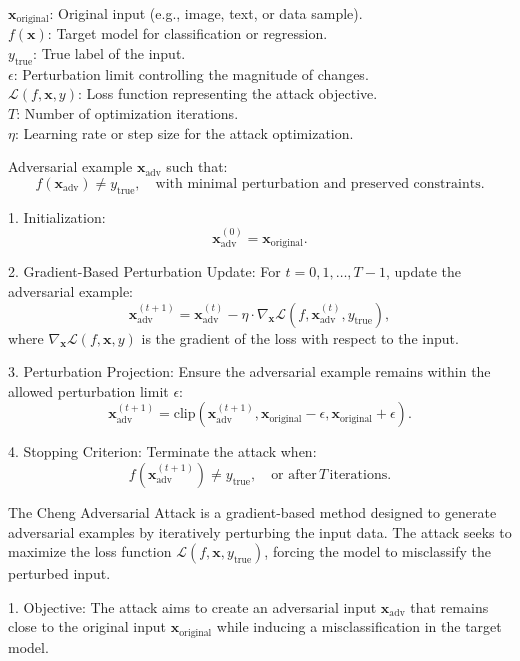 $\mathbf{x}_{\text{original}}$: Original input (e.g., image, text, or data sample). \\
$f(\mathbf{x})$: Target model for classification or regression. \\
$y_{\text{true}}$: True label of the input. \\
$\epsilon$: Perturbation limit controlling the magnitude of changes. \\
$\mathcal{L}(f, \mathbf{x}, y)$: Loss function representing the attack objective. \\
$T$: Number of optimization iterations. \\
$\eta$: Learning rate or step size for the attack optimization.

Adversarial example $\mathbf{x}_{\text{adv}}$ such that:
\[
f(\mathbf{x}_{\text{adv}}) \neq y_{\text{true}}, \quad \text{with minimal perturbation and preserved constraints}.
\]

1. Initialization:
   \[
   \mathbf{x}_{\text{adv}}^{(0)} = \mathbf{x}_{\text{original}}.
   \]

2. Gradient-Based Perturbation Update:
   For $t = 0, 1, \ldots, T-1$, update the adversarial example:
   \[
   \mathbf{x}_{\text{adv}}^{(t+1)} = \mathbf{x}_{\text{adv}}^{(t)} - \eta \cdot \nabla_{\mathbf{x}} \mathcal{L}(f, \mathbf{x}_{\text{adv}}^{(t)}, y_{\text{true}}),
   \]
   where $\nabla_{\mathbf{x}} \mathcal{L}(f, \mathbf{x}, y)$ is the gradient of the loss with respect to the input.

3. Perturbation Projection:
   Ensure the adversarial example remains within the allowed perturbation limit $\epsilon$:
   \[
   \mathbf{x}_{\text{adv}}^{(t+1)} = \text{clip}(\mathbf{x}_{\text{adv}}^{(t+1)}, \mathbf{x}_{\text{original}} - \epsilon, \mathbf{x}_{\text{original}} + \epsilon).
   \]

4. Stopping Criterion:
   Terminate the attack when:
   \[
   f(\mathbf{x}_{\text{adv}}^{(t+1)}) \neq y_{\text{true}}, \quad \text{or after} \, T \, \text{iterations}.
   \]

The Cheng Adversarial Attack is a gradient-based method designed to generate adversarial examples by iteratively perturbing the input data. The attack seeks to maximize the loss function $\mathcal{L}(f, \mathbf{x}, y_{\text{true}})$, forcing the model to misclassify the perturbed input.

1. Objective: The attack aims to create an adversarial input $\mathbf{x}_{\text{adv}}$ that remains close to the original input $\mathbf{x}_{\text{original}}$ while inducing a misclassification in the target model.

